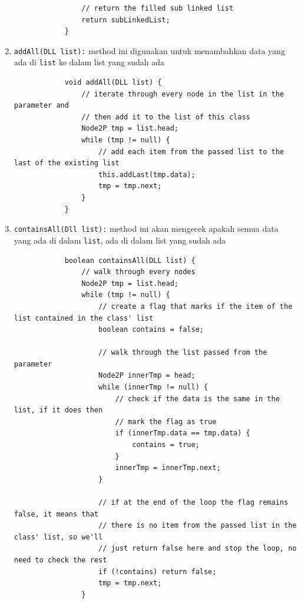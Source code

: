 \documentclass[12pt,titlepage]{article}
\begin{document}
\begin{enumerate}[label=\alph*)]
{\begin{verbatim}
                // return the filled sub linked list
                return subLinkedList;
            }
        \end{verbatim}
    }
    \item {
        \texttt{addAll(DLL list):} method ini digunakan untuk menambahkan data yang ada di \texttt{list} ke dalam list yang sudah ada

        \begin{verbatim}
            void addAll(DLL list) {
                // iterate through every node in the list in the parameter and
                // then add it to the list of this class
                Node2P tmp = list.head;
                while (tmp != null) {
                    // add each item from the passed list to the last of the existing list
                    this.addLast(tmp.data);
                    tmp = tmp.next;
                }
            }
        \end{verbatim}
    }
    \item {
        \texttt{containsAll(Dll list):} method ini akan mengecek apakah semua data yang ada di dalam \texttt{list}, ada di dalam list yang sudah ada

        \begin{verbatim}
            boolean containsAll(DLL list) {
                // walk through every nodes
                Node2P tmp = list.head;
                while (tmp != null) {
                    // create a flag that marks if the item of the list contained in the class' list
                    boolean contains = false;

                    // walk through the list passed from the parameter
                    Node2P innerTmp = head;
                    while (innerTmp != null) {
                        // check if the data is the same in the list, if it does then 
                        // mark the flag as true
                        if (innerTmp.data == tmp.data) {
                            contains = true;
                        }
                        innerTmp = innerTmp.next;
                    }

                    // if at the end of the loop the flag remains false, it means that
                    // there is no item from the passed list in the class' list, so we'll
                    // just return false here and stop the loop, no need to check the rest
                    if (!contains) return false;
                    tmp = tmp.next;
                }


\end{verbatim}}
\end{enumerate}
\end{document}
